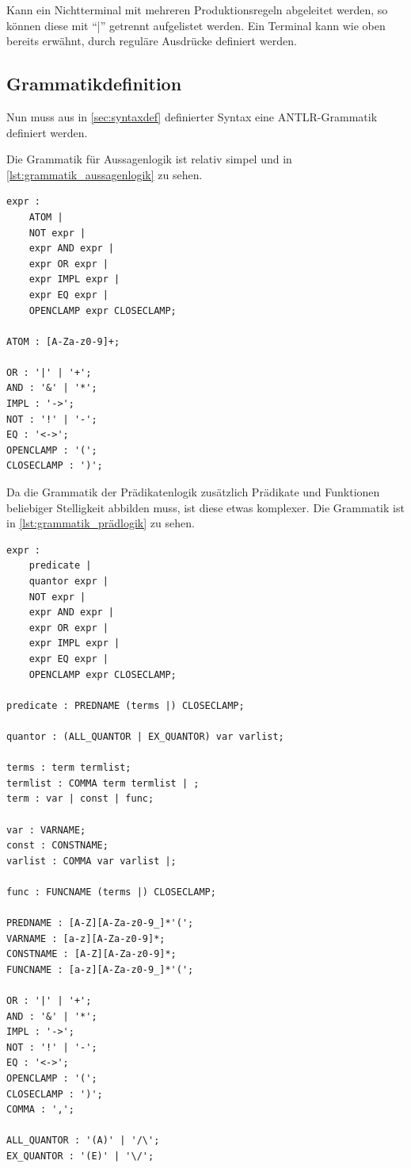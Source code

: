 Kann ein Nichtterminal mit mehreren Produktionsregeln abgeleitet werden, so können diese mit ``|'' getrennt aufgelistet werden. Ein Terminal kann wie oben bereits erwähnt, durch reguläre Ausdrücke definiert werden.

\subsection{Grammatikdefinition}
Nun muss aus in \autoref{sec:syntaxdef} definierter Syntax eine ANTLR-Grammatik definiert werden.

Die Grammatik für Aussagenlogik ist relativ simpel und in \autoref{lst:grammatik_aussagenlogik} zu sehen.

\begin{lstlisting}[caption={Grammatik der Aussagenlogik},label=lst:grammatik_aussagenlogik]
expr :
	ATOM |
	NOT expr |
	expr AND expr |
	expr OR expr |
	expr IMPL expr |
	expr EQ expr |
	OPENCLAMP expr CLOSECLAMP;

ATOM : [A-Za-z0-9]+;

OR : '|' | '+';
AND : '&' | '*';
IMPL : '->';
NOT : '!' | '-';
EQ : '<->';
OPENCLAMP : '(';
CLOSECLAMP : ')';
\end{lstlisting}

Da die Grammatik der Prädikatenlogik zusätzlich Prädikate und Funktionen beliebiger Stelligkeit abbilden muss, ist diese etwas komplexer. Die Grammatik ist in \autoref{lst:grammatik_prädlogik} zu sehen.

\begin{lstlisting}[caption={Grammatik der Prädikatenlogik},label=lst:grammatik_prädlogik]
expr :
    predicate |
    quantor expr |
    NOT expr |
    expr AND expr |
    expr OR expr |
    expr IMPL expr |
    expr EQ expr |
    OPENCLAMP expr CLOSECLAMP;

predicate : PREDNAME (terms |) CLOSECLAMP;

quantor : (ALL_QUANTOR | EX_QUANTOR) var varlist;

terms : term termlist;
termlist : COMMA term termlist | ;
term : var | const | func;

var : VARNAME;
const : CONSTNAME;
varlist : COMMA var varlist |;

func : FUNCNAME (terms |) CLOSECLAMP;

PREDNAME : [A-Z][A-Za-z0-9_]*'(';
VARNAME : [a-z][A-Za-z0-9]*;
CONSTNAME : [A-Z][A-Za-z0-9]*;
FUNCNAME : [a-z][A-Za-z0-9_]*'(';

OR : '|' | '+';
AND : '&' | '*';
IMPL : '->';
NOT : '!' | '-';
EQ : '<->';
OPENCLAMP : '(';
CLOSECLAMP : ')';
COMMA : ',';

ALL_QUANTOR : '(A)' | '/\';
EX_QUANTOR : '(E)' | '\/';
\end{lstlisting}